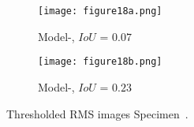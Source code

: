\begin{figure} [!h]
	\begin{subfigure}[b]{.49\textwidth}
		\centering
		\DIFdelbeginFL %
\DIFdelendFL \DIFaddbeginFL \texttt{[image: figure18a.png]}
		\DIFaddendFL \caption{Model-, \(IoU\) = \(0.07\)}
		\label{fig:RMS_threshold_L3_S4_B_saeed}
	\end{subfigure}
	\hfill
	\begin{subfigure}[b]{.49\textwidth}
		\centering
		\DIFdelbeginFL %
\DIFdelendFL \DIFaddbeginFL \texttt{[image: figure18b.png]}
		\DIFaddendFL \caption{Model-, \(IoU\) = \(0.23\)} 
		\label{fig:RMS_threshold_L3_S4_B_ijjeh}
	\end{subfigure}
	\caption{Thresholded RMS images \DIFdelbeginFL {}\DIFdelendFL \DIFaddbeginFL {}\DIFaddendFL Specimen~.}
	\label{fig:RMS_threshold_L3_S4_B__images}
\end{figure} 

